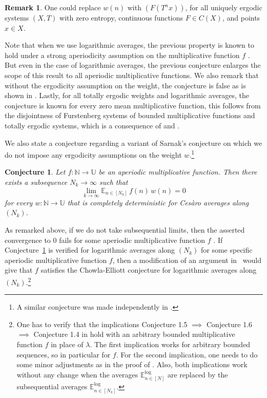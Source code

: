 \documentclass[11pt]{amsart}
\newtheorem{conjecture}{Conjecture}
\theoremstyle{definition}
\newtheorem*{remark}{Remark}
\newcommand{\lE}{\mathbb{E}^{\log}}
\newcommand{\E}{{\mathbb E}}
\newcommand{\N}{{\mathbb N}}
\newcommand{\U}{{\mathbb U}}
\begin{document}
\begin{remark}
One could replace $w(n)$ with $(F(T^nx))$, for all uniquely ergodic systems  $(X,T)$ with zero entropy,  continuous functions  $F\in C(X)$, and points $x\in X$.
\end{remark}
Note that when we use logarithmic averages, the previous property is known to hold under a  strong aperiodicity assumption on the multiplicative function $f$  \cite[Theorem~1.5]{FH21}. But even in the case of logarithmic averages, the previous conjecture   enlarges the scope of this result to all  aperiodic  multiplicative functions. We also remark that
without the ergodicity assumption on the weight, the conjecture is false as is shown in  \cite[Section~5.2]{GLR21}. Lastly, for all totally ergodic weights and logarithmic averages, the conjecture is known  for every zero mean multiplicative function, this follows from the disjointness of Furstenberg systems of bounded multiplicative functions and totally ergodic systems, which is
a consequence of \cite[Proposition~3.12]{FH18} and \cite[Theorem~1.5]{FH21}.

We also state a conjecture regarding a variant of
Sarnak's conjecture on which  we do not impose any ergodicity assumptions on the weight $w$.\footnote{A similar conjecture was made independently in \cite[Conjecture~2.11]{KMT23}.}
\begin{conjecture}\label{Con:3}
Let $f\colon \N\to \U$ be an aperiodic multiplicative function. Then there exists a subsequence $N_k\to\infty$ such that
	$$
	\lim_{k\to\infty} \E_{n\in [N_k]} \, f(n)\, w(n)=0
	$$
	for every
	 $w\colon \N\to \U$ that is completely deterministic for Ces\`aro averages along  $(N_k)$.
\end{conjecture}
As remarked above, if we do not take subsequential limits,  then  the asserted convergence to $0$ fails  for some aperiodic multiplicative function $f$ \cite[Section~5.2]{GLR21}.
 If   Conjecture~\ref{Con:3} is verified
  for logarithmic averages along $(N_k)$ for some  specific
 aperiodic multiplicative function $f$,
then a modification of an  argument in~\cite{Tao17} would give that $f$ satisfies the Chowla-Elliott  conjecture for logarithmic averages  along $(N_k)$.\footnote{One has to verify that the implications Conjecture 1.5 $\implies$  Conjecture 1.6 $\implies$ Conjecture 1.4 in \cite{Tao17} hold with an arbitrary bounded multiplicative function $f$ in place of $\lambda$. The first implication works for arbitrary bounded sequences, so in particular for $f$. For the second implication, one  needs to do some minor adjustments as in the proof of \cite[Theorem~1.7]{F17}. Also, both implications work without any change when the averages $\lE_{n\in[N]}$ are replaced by the subsequential averages $\lE_{n\in[N_k]}$.}
\end{document}
